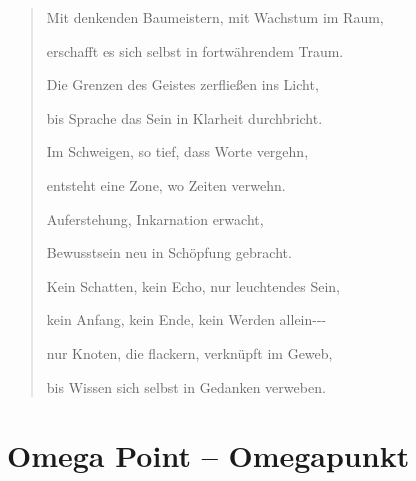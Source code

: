 \documentclass[
  ngerman,
]{article}
\begin{document}
\begin{quote}
Mit denkenden Baumeistern, mit Wachstum im Raum,

erschafft es sich selbst in fortwährendem Traum.

Die Grenzen des Geistes zerfließen ins Licht,

bis Sprache das Sein in Klarheit durchbricht.

Im Schweigen, so tief, dass Worte vergehn,

entsteht eine Zone, wo Zeiten verwehn.

Auferstehung, Inkarnation erwacht,

Bewusstsein neu in Schöpfung gebracht.

Kein Schatten, kein Echo, nur leuchtendes Sein,

kein Anfang, kein Ende, kein Werden allein-\/-\/-

nur Knoten, die flackern, verknüpft im Geweb,

bis Wissen sich selbst in Gedanken verweben.
\end{quote}

\section{\texorpdfstring{\textbf{Omega Point --
Omegapunkt}}{Omega Point -- Omegapunkt}}\label{omega-point-omegapunkt-1}
\end{document}
